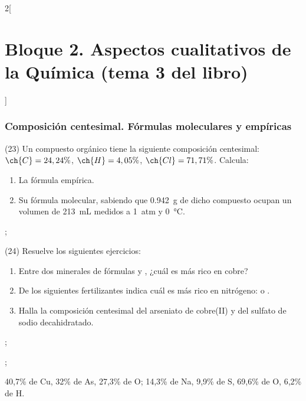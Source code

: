 \documentclass[10pt]{article}
\begin{document}
\begin{multicols}{2}[
    \section{Bloque 2. Aspectos cualitativos de la Química (tema 3 del libro)}
  ]
\subsubsection{Composición centesimal. Fórmulas moleculares y empíricas}


\begin{exercise}[
    tags    = {},
    topics  = {química,química básica},
    source  = {FQ 1B MGH 2016, p84, e23},
  ]
  (23) Un compuesto orgánico tiene la siguiente composición centesimal: \( \ch{C} = 24,24\% \), \( \ch{H} = 4,05\% \), \( \ch{Cl} = 71,71\% \). Calcula: %
  \begin{enumerate}
    \item La fórmula empírica.
    \item Su fórmula molecular, sabiendo que \SI{0.942}{\gram} de dicho compuesto ocupan un volumen de \SI{213}{\milli\liter} medidos a \SI{1}{atm} y \SI{0}{\celsius}.
  \end{enumerate}
\end{exercise}

\begin{solution}
  \begin{enumerate*}
    \item {};
    \item {}
  \end{enumerate*}
\end{solution}




\begin{exercise}[
    tags    = {},
    topics  = {química,química básica},
    source  = {FQ 1B MGH 2016, p84, e24},
  ]
  (24) Resuelve los siguientes ejercicios:
  \begin{enumerate}
    \item Entre dos minerales de fórmulas  y , ¿cuál es más rico en cobre?
    \item De los siguientes fertilizantes indica cuál es más rico en nitrógeno:  o .
    \item Halla la composición centesimal del arseniato de cobre(II)
    y del sulfato de sodio decahidratado.
  \end{enumerate}
\end{exercise}

\begin{solution}
  \begin{enumerate*}
    \item {};
    \item {};
    \item 40,7\% de Cu, 32\% de As, 27,3\% de O; 14,3\% de Na, 9,9\% de S, 69,6\% de O, 6,2\% de H.
  \end{enumerate*}
\end{solution}





\end{multicols}
\end{document}
